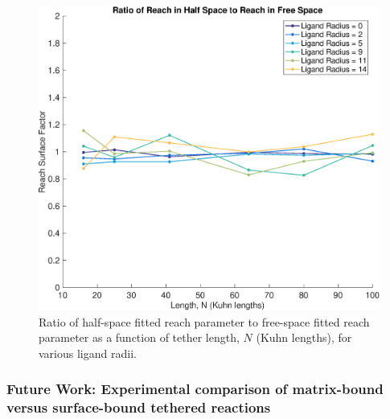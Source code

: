\documentclass[../../AdvancementSummary.tex]{subfiles}
\begin{document}
\begin{figure}[H]
    \begin{center}
        		\includegraphics[width=0.7\linewidth]{ResultsFigures/ReachSurfaceFactor/ReachSurfaceFactor.eps}
        \caption{Ratio of half-space fitted reach parameter to free-space fitted reach parameter as a function of tether length, $N$ (Kuhn lengths), for various ligand radii. \label{fig: ReachSurfaceFactor}}
    \end{center}
\end{figure}


\subsubsection{Future Work: Experimental comparison of matrix-bound versus surface-bound tethered reactions}
\end{document}
